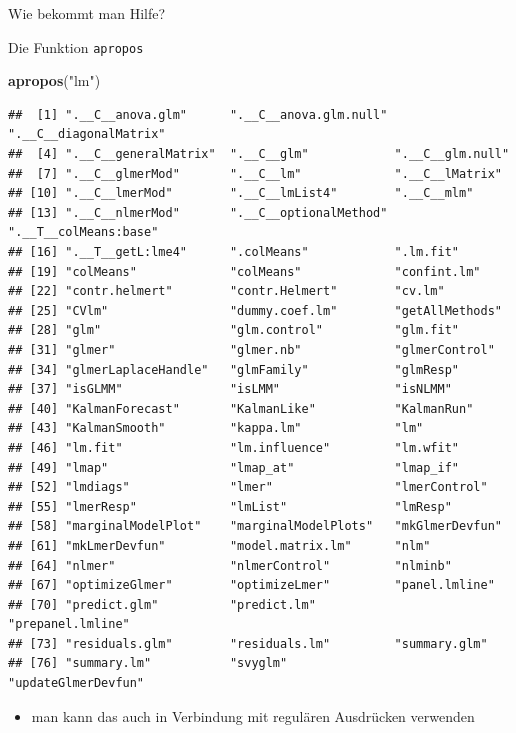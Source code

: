\documentclass[ignorenonframetext,]{beamer}
\newenvironment{Shaded}{}{}
\newcommand{\KeywordTok}[1]{\textcolor[rgb]{0.00,0.44,0.13}{\textbf{{#1}}}}
\newcommand{\StringTok}[1]{\textcolor[rgb]{0.25,0.44,0.63}{{#1}}}
\newcommand{\NormalTok}[1]{{#1}}
\providecommand{\tightlist}{%
\setlength{\itemsep}{0pt}\setlength{\parskip}{0pt}}
\begin{document}
\begin{frame}[fragile]{Wie bekommt man Hilfe?}
\begin{block}{Die Funktion \texttt{apropos}}
\begin{Shaded}
\begin{Highlighting}[]
\KeywordTok{apropos}\NormalTok{(}\StringTok{"lm"}\NormalTok{)}
\end{Highlighting}
\end{Shaded}

\begin{verbatim}
##  [1] ".__C__anova.glm"      ".__C__anova.glm.null" ".__C__diagonalMatrix"
##  [4] ".__C__generalMatrix"  ".__C__glm"            ".__C__glm.null"      
##  [7] ".__C__glmerMod"       ".__C__lm"             ".__C__lMatrix"       
## [10] ".__C__lmerMod"        ".__C__lmList4"        ".__C__mlm"           
## [13] ".__C__nlmerMod"       ".__C__optionalMethod" ".__T__colMeans:base" 
## [16] ".__T__getL:lme4"      ".colMeans"            ".lm.fit"             
## [19] "colMeans"             "colMeans"             "confint.lm"          
## [22] "contr.helmert"        "contr.Helmert"        "cv.lm"               
## [25] "CVlm"                 "dummy.coef.lm"        "getAllMethods"       
## [28] "glm"                  "glm.control"          "glm.fit"             
## [31] "glmer"                "glmer.nb"             "glmerControl"        
## [34] "glmerLaplaceHandle"   "glmFamily"            "glmResp"             
## [37] "isGLMM"               "isLMM"                "isNLMM"              
## [40] "KalmanForecast"       "KalmanLike"           "KalmanRun"           
## [43] "KalmanSmooth"         "kappa.lm"             "lm"                  
## [46] "lm.fit"               "lm.influence"         "lm.wfit"             
## [49] "lmap"                 "lmap_at"              "lmap_if"             
## [52] "lmdiags"              "lmer"                 "lmerControl"         
## [55] "lmerResp"             "lmList"               "lmResp"              
## [58] "marginalModelPlot"    "marginalModelPlots"   "mkGlmerDevfun"       
## [61] "mkLmerDevfun"         "model.matrix.lm"      "nlm"                 
## [64] "nlmer"                "nlmerControl"         "nlminb"              
## [67] "optimizeGlmer"        "optimizeLmer"         "panel.lmline"        
## [70] "predict.glm"          "predict.lm"           "prepanel.lmline"     
## [73] "residuals.glm"        "residuals.lm"         "summary.glm"         
## [76] "summary.lm"           "svyglm"               "updateGlmerDevfun"
\end{verbatim}

\begin{itemize}
\tightlist
\item
  man kann das auch in Verbindung mit regulären Ausdrücken verwenden
\end{itemize}


\end{block}
\end{frame}
\end{document}
